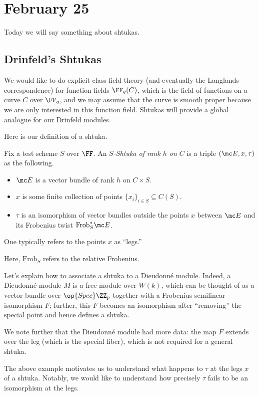 \documentclass[../notes.tex]{subfiles}
\begin{document}
\section{February 25}

Today we will say something about shtukas.

\subsection{Drinfeld's Shtukas}
We would like to do explicit class field theory (and eventually the Langlands correspondence) for function fields $\FF_q(C)$, which is the field of functions on a curve $C$ over $\FF_q$, and we may assume that the curve is smooth proper because we are only interested in this function field. 
Shtukas will provide a global analogue for our Drinfeld modules.

Here is our definition of a shtuka.
\begin{definition}[shtuka]
	Fix a test scheme $S$ over $\FF$. An \textit{$S$-Shtuka of rank $h$ on $C$} is a triple $(\mc E,x,\tau)$ as the following.
	\begin{itemize}
		\item $\mc E$ is a vector bundle of rank $h$ on $C\times S$.
		\item $x$ is some finite collection of points $\{x_i\}_{i\in S}\subseteq C(S)$.
		\item $\tau$ is an isomorphism of vector bundles outside the points $x$ between $\mc E$ and its Frobenius twist $\mathrm{Frob}_S^*\mc E$.
	\end{itemize}
	One typically refers to the points $x$ as ``legs.''
\end{definition}
Here, $\mathrm{Frob}_S$ refers to the relative Frobenius.
\begin{example}
	Let's explain how to associate a shtuka to a Dieudonn\'e module. Indeed, a Dieudonn\'e module $M$ is a free module over $W(k)$, which can be thought of as a vector bundle over $\op{Spec}\ZZ_p$ together with a Frobenius-semilinear isomorphism $F$; further, this $F$ becomes an isomorphism after ``removing'' the special point and hence defines a shtuka.

	We note further that the Dieudonn\'e module had more data: the map $F$ extends over the leg (which is the special fiber), which is not required for a general shtuka.
\end{example}
The above example motivates us to understand what happens to $\tau$ at the legs $x$ of a shtuka. Notably, we would like to understand how precisely $\tau$ fails to be an isomorphism at the legs.
\end{document}
